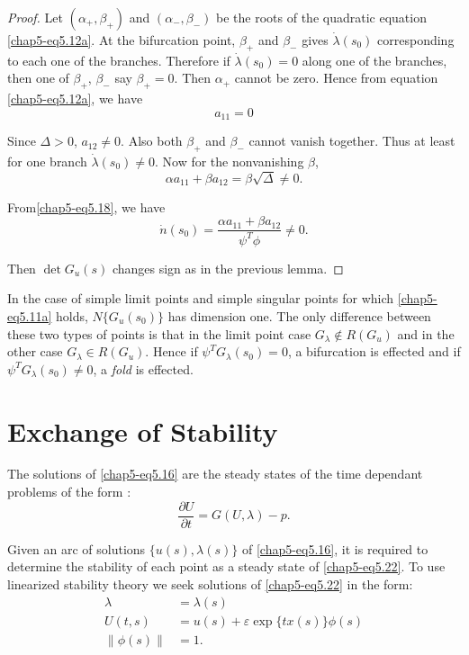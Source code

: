 \begin{proof}%
Let $(\alpha_{+}, \beta_{+})$ and $(\alpha_{-}, \beta_{-})$ be the
roots of the quadratic equation \eqref{chap5-eq5.12a}. At the bifurcation point,
$\beta_{+}$ and $\beta_{-}$ gives $\dot{\lambda}(s_{0})$ corresponding
to each one of the branches. Therefore if $\dot{\lambda}(s_{0}) = 0$
along one of the branches, then one of $\beta_{+}$, $\beta_{-}$ say
$\beta_{+} = 0$. Then $\alpha_{+}$ cannot be zero. Hence from equation
\eqref{chap5-eq5.12a}, we have     
$$
a_{11} = 0
$$

Since $\Delta > 0$, $a_{12} \neq 0$. Also both $\beta_{+}$ and
$\beta_{-}$ cannot vanish together. Thus at least for one branch
$\dot{\lambda}(s_{0}) \neq 0$. Now for the nonvanishing $\beta$,  
$$
\alpha a_{11} + \beta a_{12} = \beta \sqrt{\Delta} \neq 0. 
$$

From\pageoriginale \eqref{chap5-eq5.18}, we have
$$
\dot{n}(s_{0}) = \frac{\alpha a_{11} + \beta a_{12}}{\psi^{T}\phi}
\neq 0. 
$$

Then $\det G_{u}(s)$ changes sign as in the previous lemma.
\end{proof}

\begin{remark*}%
In the case of simple limit points and simple singular points for
which \eqref{chap5-eq5.11a} holds, $N\{G_{u}(s_{0})\}$ has dimension
one. The only 
difference between these two types of points is that in the limit
point case $G_{\lambda} \not \in R(G_{u})$ and in the other
case $G_{\lambda} \in R(G_{u})$. Hence if
$\psi^{T}G_{\lambda}(s_{0}) = 0$, a bifurcation is effected and if
$\psi^{T}G_{\lambda}(s_{0}) \neq 0$, a {\em fold} is effected.  
\end{remark*}

\setcounter{section}{20}
\section{Exchange of Stability}\label{chap5-sec5.21}%

The solutions of \eqref{chap5-eq5.16} are the steady states of the
time dependant 
problems of the form : 
\begin{equation*}
\frac {\partial U}{\partial t} = G(U, \lambda) -
p. \tag{5.22}\label{chap5-eq5.22} 
\end{equation*}

Given an arc of solutions $\{u (s), \lambda(s)\}$ of
\eqref{chap5-eq5.16}, it is 
required to determine the stability of each point as a steady state of
\eqref{chap5-eq5.22}. To use linearized stability theory we seek solutions of
\eqref{chap5-eq5.22} in the form:  
\begin{equation*}
\begin{split}
\lambda & = \lambda (s)\\
U (t,s) & = u(s) + \varepsilon \exp \{tx (s)\} \phi(s)\\
\| \phi (s) \| & = 1.
\end{split}\tag{5.23}\label{chap5-eq5.23}
\end{equation*}

